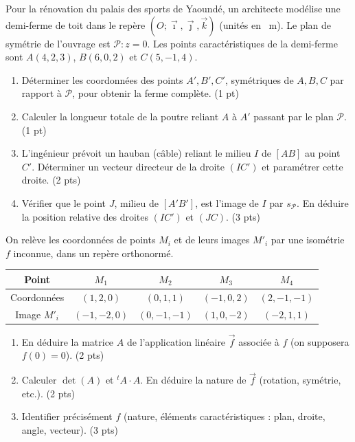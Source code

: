 \documentclass[11pt]{article}
\begin{document}
\begin{exercice}
Pour la rénovation du palais des sports de Yaoundé, un architecte modélise une demi-ferme de toit dans le repère $(O;\vec{\imath},\vec{\jmath},\vec{k})$ (unités en \SI{}{m}). Le plan de symétrie de l'ouvrage est $\mathcal{P} : z = 0$. Les points caractéristiques de la demi-ferme sont $A(4, 2, 3)$, $B(6, 0, 2)$ et $C(5, -1, 4)$.
\begin{enumerate}
    \item Déterminer les coordonnées des points $A', B', C'$, symétriques de $A, B, C$ par rapport à $\mathcal{P}$, pour obtenir la ferme complète. \hfill (1 pt)
    \item Calculer la longueur totale de la poutre reliant $A$ à $A'$ passant par le plan $\mathcal{P}$. \hfill (1 pt)
    \item L'ingénieur prévoit un hauban (câble) reliant le milieu $I$ de $[AB]$ au point $C'$. Déterminer un vecteur directeur de la droite $(IC')$ et paramétrer cette droite. \hfill (2 pts)
    \item Vérifier que le point $J$, milieu de $[A'B']$, est l'image de $I$ par $s_{\mathcal{P}}$. En déduire la position relative des droites $(IC')$ et $(JC)$. \hfill (3 pts)
\end{enumerate}
\end{exercice}

\begin{exercice}
On relève les coordonnées de points $M_i$ et de leurs images $M'_i$ par une isométrie $f$ inconnue, dans un repère orthonormé.

\begin{center}
\begin{tabular}{|c|c|c|c|c|}
\hline
Point & $M_1$ & $M_2$ & $M_3$ & $M_4$ \\
\hline
Coordonnées & $(1, 2, 0)$ & $(0, 1, 1)$ & $(-1, 0, 2)$ & $(2, -1, -1)$ \\
\hline
Image $M'_i$ & $(-1, -2, 0)$ & $(0, -1, -1)$ & $(1, 0, -2)$ & $(-2, 1, 1)$ \\
\hline
\end{tabular}
\end{center}

\begin{enumerate}
    \item En déduire la matrice $A$ de l'application linéaire $\vec{f}$ associée à $f$ (on supposera $f(0)=0$). \hfill (2 pts)
    \item Calculer $\det(A)$ et $^t\!A \cdot A$. En déduire la nature de $\vec{f}$ (rotation, symétrie, etc.). \hfill (2 pts)
    \item Identifier précisément $f$ (nature, éléments caractéristiques : plan, droite, angle, vecteur). \hfill (3 pts)
\end{enumerate}
\end{exercice}
\end{document}
